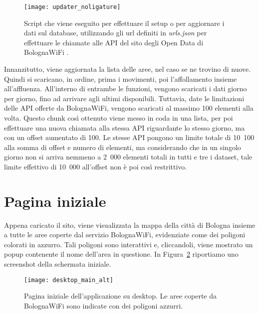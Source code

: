 \begin{figure}[H]
    \centering
    \texttt{[image: updater\_noligature]}
    \caption[Script per setup o aggiornamento di dati sul database]{Script che viene eseguito per effettuare il setup o per aggiornare i dati sul database, utilizzando gli url definiti in \textit{urls.json} per effettuare le chiamate alle API del sito degli Open Data di BolognaWiFi \cite{BolognaWiFi_Spostamenti,BolognaWiFi_Affollamento,BolognaWiFi_Affluenza}.}
    \label{fig:updater}
\end{figure}

Innanzitutto, viene aggiornata la lista delle aree, nel caso se ne trovino di nuove. Quindi si scaricano, in ordine, prima i movimenti, poi l'affollamento insieme all'affluenza. All'interno di entrambe le funzioni, vengono scaricati i dati giorno per giorno, fino ad arrivare agli ultimi disponibili. Tuttavia, date le limitazioni delle API offerte da BolognaWiFi, vengono scaricati al massimo 100 elementi alla volta. Questo chunk così ottenuto viene messo in coda in una lista, per poi effettuare una nuova chiamata alla stessa API riguardante lo stesso giorno, ma con un offset aumentato di 100. Le stesse API pongono un limite totale di 10~100 alla somma di offset e numero di elementi, ma considerando che in un singolo giorno non si arriva nemmeno a 2~000 elementi totali in tutti e tre i dataset, tale limite effettivo di 10~000 all'offset non è poi così restrittivo.

\section{Pagina iniziale}
Appena caricato il sito, viene visualizzata la mappa della città di Bologna insieme a tutte le aree coperte dal servizio BolognaWiFi, evidenziate come dei poligoni colorati in azzurro. Tali poligoni sono interattivi e, cliccandoli, viene mostrato un popup contenente il nome dell'area in questione. In Figura~\ref{fig:desktop_main} riportiamo uno screenshot della schermata iniziale.

\begin{figure}[H]
    \centering
    \texttt{[image: desktop\_main\_alt]}
    \caption[Pagina iniziale su desktop]{Pagina iniziale dell'applicazione su desktop. Le aree coperte da BolognaWiFi sono indicate con dei poligoni azzurri.}
    \label{fig:desktop_main}
\end{figure}

